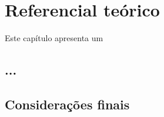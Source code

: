 %
\chapter{Referencial teórico}
\label{chapter:background}

%
Este capítulo apresenta um


\section{...}


%
\section{Considerações finais}

